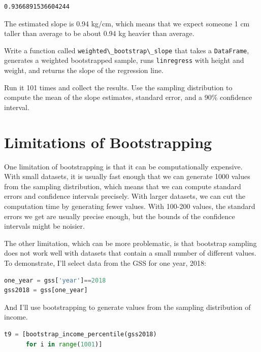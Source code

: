 \begin{lstlisting}[style=output]
0.9366891536604244
\end{lstlisting}

The estimated slope is 0.94 kg/cm, which means that we expect someone 1
cm taller than average to be about 0.94 kg heavier than average.

Write a function called
\passthrough{\lstinline!weighted\_bootstrap\_slope!} that takes a
\passthrough{\lstinline!DataFrame!}, generates a weighted bootstrapped
sample, runs \passthrough{\lstinline!linregress!} with height and
weight, and returns the slope of the regression line.

Run it 101 times and collect the results. Use the sampling distribution
to compute the mean of the slope estimates, standard error, and a 90\%
confidence interval.

\section{Limitations of
Bootstrapping}\label{limitations-of-bootstrapping}

One limitation of bootstrapping is that it can be computationally
expensive. With small datasets, it is usually fast enough that we can
generate 1000 values from the sampling distribution, which means that we
can compute standard errors and confidence intervals precisely. With
larger datasets, we can cut the computation time by generating fewer
values. With 100-200 values, the standard errors we get are usually
precise enough, but the bounds of the confidence intervals might be
noisier.

The other limitation, which can be more problematic, is that bootstrap
sampling does not work well with datasets that contain a small number of
different values. To demonstrate, I'll select data from the GSS for one
year, 2018:

\begin{lstlisting}[language=Python,style=source]
one_year = gss['year']==2018
gss2018 = gss[one_year]
\end{lstlisting}

And I'll use bootstrapping to generate values from the sampling
distribution of income.

\begin{lstlisting}[language=Python,style=source]
t9 = [bootstrap_income_percentile(gss2018)
      for i in range(1001)]
\end{lstlisting}

